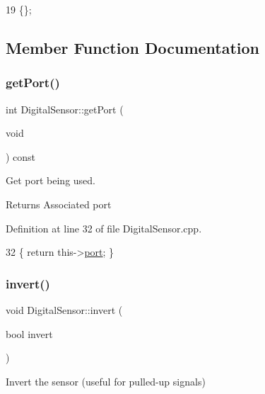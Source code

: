 \begin{DoxyCode}
19 \{\};
\end{DoxyCode}


\subsection{Member Function Documentation}
\mbox{\label{class_digital_sensor_a621247d2f977e6560c5282a867cc24dc}} 
\subsubsection{\texorpdfstring{get\+Port()}{getPort()}}
{\footnotesize\ttfamily int Digital\+Sensor\+::get\+Port (\begin{DoxyParamCaption}\item[{void}]{ }\end{DoxyParamCaption}) const}



Get port being used. 

\begin{DoxyReturn}{Returns}
Associated port 
\end{DoxyReturn}


Definition at line 32 of file Digital\+Sensor.\+cpp.


\begin{DoxyCode}
32 \{ \textcolor{keywordflow}{return} this->\hyperlink{class_digital_sensor_a5d6d5b9d33670b7f2d8b745b175ce023}{port}; \}
\end{DoxyCode}
\mbox{\label{class_digital_sensor_a1e6784022a127dd543bbfcc4f69c4802}} 
\subsubsection{\texorpdfstring{invert()}{invert()}}
{\footnotesize\ttfamily void Digital\+Sensor\+::invert (\begin{DoxyParamCaption}\item[{bool}]{invert }\end{DoxyParamCaption})}



Invert the sensor (useful for pulled-\/up signals) 


